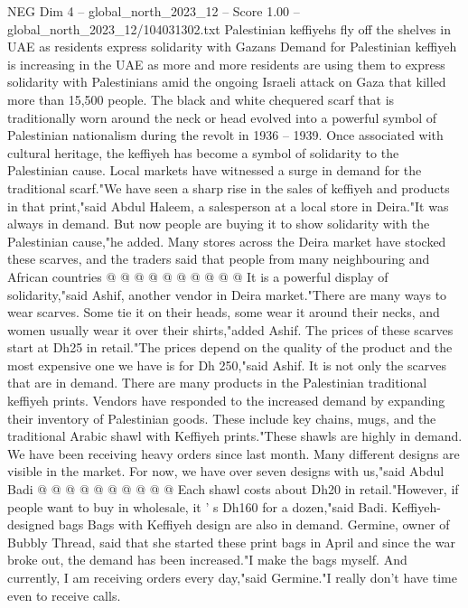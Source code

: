 \begin{textsample}{NEG Dim 4 – global\_north\_2023\_12 – Score 1.00 – global\_north\_2023\_12/104031302.txt}  \label{ex:f4_neg_148}
Palestinian keffiyehs fly off the shelves in UAE as residents express solidarity with Gazans Demand for Palestinian keffiyeh is increasing in the UAE as more and more residents are using them to express solidarity with Palestinians amid the ongoing Israeli attack on Gaza that killed more than 15,500 people.
The black and white chequered scarf that is traditionally worn around the neck or head evolved into a powerful symbol of Palestinian nationalism during the revolt in 1936 -- 1939.
Once associated with cultural heritage, the keffiyeh has become a symbol of solidarity to the Palestinian cause.
Local markets have witnessed a surge in demand for the traditional scarf."We have seen a sharp rise in the sales of keffiyeh and products in that print,"said Abdul Haleem, a salesperson at a local store in Deira."It was always in demand.
But now people are buying it to show solidarity with the Palestinian cause,"he added.
Many stores across the Deira market have stocked these scarves, and the traders said that people from many neighbouring and African countries @ @ @ @ @ @ @ @ @ @ It is a powerful display of solidarity,"said Ashif, another vendor in Deira market."There are many ways to wear scarves.
Some tie it on their heads, some wear it around their necks, and women usually wear it over their shirts,"added Ashif.
The prices of these scarves start at Dh25 in retail."The prices depend on the quality of the product and the most expensive one we have is for Dh 250,"said Ashif.
It is not only the scarves that are in demand.
There are many products in the Palestinian traditional keffiyeh prints.
Vendors have responded to the increased demand by expanding their inventory of Palestinian goods.
These include key chains, mugs, and the traditional Arabic shawl with Keffiyeh prints."These shawls are highly in demand.
We have been receiving heavy orders since last month.
Many different designs are visible in the market.
For now, we have over seven designs with us,"said Abdul Badi @ @ @ @ @ @ @ @ @ @ Each shawl costs about Dh20 in retail."However, if people want to buy in wholesale, it ' s Dh160 for a dozen,"said Badi.
Keffiyeh-designed bags Bags with Keffiyeh design are also in demand.
Germine, owner of Bubbly Thread, said that she started these print bags in April and since the war broke out, the demand has been increased."I make the bags myself.
And currently, I am receiving orders every day,"said Germine."I really don't have time even to receive calls.

\end{textsample}
